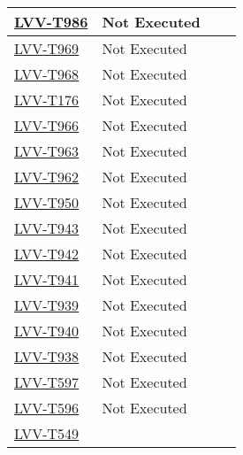 \documentclass[DM,lsstdraft,STR,toc]{lsstdoc}
\begin{document}
\begin{longtable}{p{}p{}p{}p{}}
    \href{https://jira.lsstcorp.org/secure/Tests.jspa#/testCase/LVV-T986}{LVV-T986}
    & Not Executed &  &
    \\\hline
    \href{https://jira.lsstcorp.org/secure/Tests.jspa#/testCase/LVV-T969}{LVV-T969}
    & Not Executed &  &
    \\\hline
    \href{https://jira.lsstcorp.org/secure/Tests.jspa#/testCase/LVV-T968}{LVV-T968}
    & Not Executed &  &
    \\\hline
    \href{https://jira.lsstcorp.org/secure/Tests.jspa#/testCase/LVV-T176}{LVV-T176}
    & Not Executed &  &
    \\\hline
    \href{https://jira.lsstcorp.org/secure/Tests.jspa#/testCase/LVV-T966}{LVV-T966}
    & Not Executed &  &
    \\\hline
    \href{https://jira.lsstcorp.org/secure/Tests.jspa#/testCase/LVV-T963}{LVV-T963}
    & Not Executed &  &
    \\\hline
    \href{https://jira.lsstcorp.org/secure/Tests.jspa#/testCase/LVV-T962}{LVV-T962}
    & Not Executed &  &
    \\\hline
    \href{https://jira.lsstcorp.org/secure/Tests.jspa#/testCase/LVV-T950}{LVV-T950}
    & Not Executed &  &
    \\\hline
    \href{https://jira.lsstcorp.org/secure/Tests.jspa#/testCase/LVV-T943}{LVV-T943}
    & Not Executed &  &
    \\\hline
    \href{https://jira.lsstcorp.org/secure/Tests.jspa#/testCase/LVV-T942}{LVV-T942}
    & Not Executed &  &
    \\\hline
    \href{https://jira.lsstcorp.org/secure/Tests.jspa#/testCase/LVV-T941}{LVV-T941}
    & Not Executed &  &
    \\\hline
    \href{https://jira.lsstcorp.org/secure/Tests.jspa#/testCase/LVV-T939}{LVV-T939}
    & Not Executed &  &
    \\\hline
    \href{https://jira.lsstcorp.org/secure/Tests.jspa#/testCase/LVV-T940}{LVV-T940}
    & Not Executed &  &
    \\\hline
    \href{https://jira.lsstcorp.org/secure/Tests.jspa#/testCase/LVV-T938}{LVV-T938}
    & Not Executed &  &
    \\\hline
    \href{https://jira.lsstcorp.org/secure/Tests.jspa#/testCase/LVV-T597}{LVV-T597}
    & Not Executed &  &
    \\\hline
    \href{https://jira.lsstcorp.org/secure/Tests.jspa#/testCase/LVV-T596}{LVV-T596}
    & Not Executed &  &
    \\\hline
    \href{https://jira.lsstcorp.org/secure/Tests.jspa#/testCase/LVV-T549}{LVV-T549}

\end{longtable}
\end{document}

